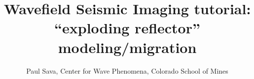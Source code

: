 

\author{Paul Sava, Center for Wave Phenomena, Colorado School of Mines}
\title{Wavefield Seismic Imaging tutorial:
  ``exploding reflector'' modeling/migration}
\maketitle


